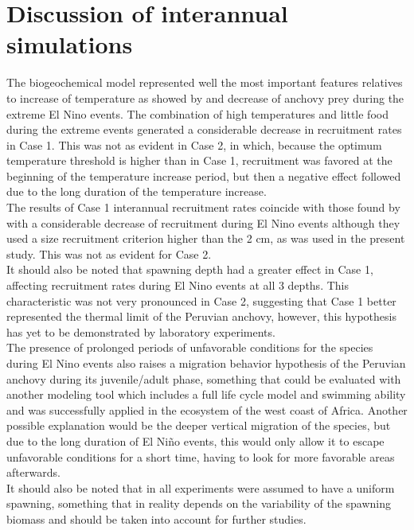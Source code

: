 \section{Discussion of interannual simulations}\label{Chap3Disc2}

The biogeochemical model represented well the most important features relatives to increase of temperature as showed by \citep{ColaCape2008} and decrease of anchovy prey \citep{AyonSwar2011}during the extreme El Nino events. The combination of high temperatures and little food during the extreme events generated a considerable decrease in recruitment rates in Case 1. This was not as evident in Case 2, in which, because the optimum temperature threshold is higher than in Case 1, recruitment was favored at the beginning of the temperature increase period, but then a negative effect followed due to the long duration of the temperature increase.\\

The results of Case 1 interannual recruitment rates coincide with those found by \cite{XuChai2013} with a considerable decrease of recruitment during El Nino events although they used a size recruitment criterion higher than the 2 cm, as was used in the present study. This was not as evident for Case 2.\\

It should also be noted that spawning depth had a greater effect in Case 1, affecting recruitment rates during El Nino events at all 3 depths. This characteristic was not very pronounced in Case 2, suggesting that Case 1 better represented the thermal limit of the Peruvian anchovy, however, this hypothesis has yet to be demonstrated by laboratory experiments.\\

The presence of prolonged periods of unfavorable conditions for the species during El Nino events also raises a migration behavior hypothesis of the Peruvian anchovy during its juvenile/adult phase, something that could be evaluated with another modeling tool \citep{BrocAuge2018} which includes a full life cycle model and swimming ability and was successfully applied in the ecosystem of the west coast of Africa. Another possible explanation would be the deeper vertical migration of the species, but due to the long duration of El Niño events, this would only allow it to escape unfavorable conditions for a short time, having to look for more favorable areas afterwards.\\

It should also be noted that in all experiments were assumed to have a uniform spawning, something that in reality depends on the variability of the spawning biomass \citep{CahuCubi2009} and should be taken into account for further studies.

\clearpage
